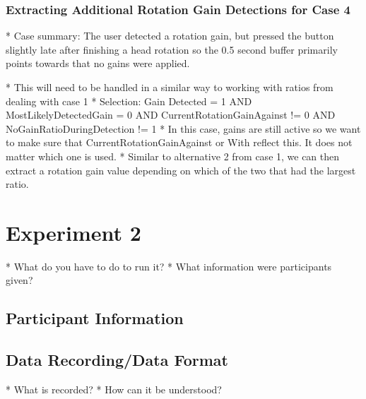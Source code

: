 \subsubsection{Extracting Additional Rotation Gain Detections for Case 4}
  * Case summary: The user detected a rotation gain, but pressed the button slightly late after finishing a head rotation so the 0.5 second buffer primarily points towards that no gains were applied. 

  * This will need to be handled in a similar way to working with ratios from dealing with case 1
  * Selection: Gain Detected = 1 AND MostLikelyDetectedGain = 0 AND CurrentRotationGainAgainst != 0 AND NoGainRatioDuringDetection != 1
  * In this case, gains are still active so we want to make sure that CurrentRotationGainAgainst or With reflect this. It does not matter which one is used. 
  * Similar to alternative 2 from case 1, we can then extract a rotation gain value depending on which of the two that had the largest ratio.

\section{Experiment 2}
* What do you have to do to run it?
* What information were participants given?

\subsection{Participant Information}\label{sec:ex2information}

\subsection{Data Recording/Data Format}\label{sec:ex2dataformat}

  * What is recorded?
  * How can it be understood?

